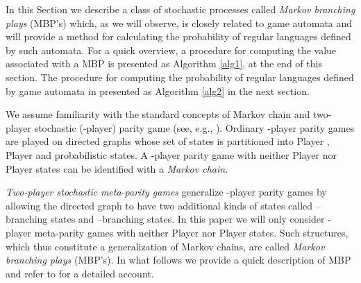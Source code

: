 

In this Section we describe a class of stochastic processes called \emph{Markov branching plays} (MBP's) \cite{MioThesis,MIO2012b}  which, as we will observe, is closely related to game automata and will provide a method for calculating the probability of regular languages defined by such automata.  
For a quick overview, a procedure for computing the value associated with a MBP is presented as Algorithm \ref{alg1}, at the end of this section. The procedure for computing the probability  of regular languages defined by game automata in presented as Algorithm \ref{alg2} in the next section.



We assume familiarity with the standard concepts of Markov chain and two-player stochastic (-player) parity game (see, e.g.,  \cite{ChatPhD}).  Ordinary -player parity games are played on directed graphs whose set of states is partitioned into Player , Player  and probabilistic states. A -player parity game with neither Player  nor Player  states can be identified with a \emph{Markov chain}. 



\begin{comment}
Recall that ordinary -player parity games  are played on directed graphs whose set of states is partitioned into Player  and Player  states, where the two players make their moves, and probabilistic states, where the game progresses to a successor state following a prescribed probabilistic rule. A -player parity game without Player  states is called a \emph{Markov Decision Process} (MDP). A -player parity game with neither Player  nor Player  states (i.e., only having probabilistic states) can be identified with a \emph{Markov chain}. \todo{Here I uncommented certain piece which was reserved for the journal version.}
\end{comment}

\emph{Two-player stochastic} \emph{meta-parity games} \cite{MioThesis,MIO2012b} generalize -player parity games by allowing the directed graph to have two additional kinds of states called --branching states and --branching states. In this paper we will only consider -player meta-parity games with neither Player  nor Player  states. Such structures, which thus constitute a generalization of Markov chains, are called \emph{Markov branching plays} (MBP's). In what follows we provide a quick description of MBP and refer to \cite{MioThesis} for a detailed account.

